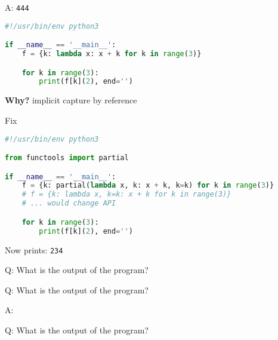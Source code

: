 \addtocounter{framenumber}{-1}
\begin{frame}[fragile]{A: \texttt{444}}
    \begin{lstlisting}[language=python]
#!/usr/bin/env python3

if __name__ == '__main__':
    f = {k: lambda x: x + k for k in range(3)}

    for k in range(3):
        print(f[k](2), end='')
    \end{lstlisting}

    \hfill \textbf{Why?} implicit capture by reference
\end{frame}

\begin{frame}[fragile]{Fix}
    \begin{lstlisting}[language=python]
#!/usr/bin/env python3

from functools import partial

if __name__ == '__main__':
    f = {k: partial(lambda x, k: x + k, k=k) for k in range(3)}
    # f = {k: lambda x, k=k: x + k for k in range(3)}
    # ... would change API

    for k in range(3):
        print(f[k](2), end='')
    \end{lstlisting}
    
    Now prints: \texttt{234}
\end{frame}

\begin{frame}[fragile]{Q: What is the output of the program?}

\end{frame}

\begin{frame}[fragile]{Q: What is the output of the program?}
\end{frame}

\addtocounter{framenumber}{-1}
\begin{frame}[fragile]{A: }
\end{frame}

\begin{frame}[fragile]{Q: What is the output of the program?}
\end{frame}

